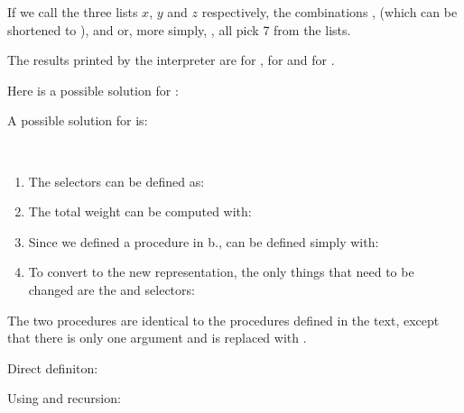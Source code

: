 \begin{exe}[2.25]
    If we call the three lists $x$, $y$ and $z$ respectively, the combinations 
    ,  (which can be 
    shortened to ), and\linebreak
    or, more simply,
    ,
    all pick 7 from the lists.
\end{exe}

\begin{exe}[2.26]
    The results printed by the interpreter are  for
    ,  for  and
     for .
\end{exe}

\begin{exe}[2.27]
    Here is a possible solution for :
\end{exe}

\begin{exe}[2.28]
    A possible solution for  is:
\end{exe}

\begin{exe}[2.29]
    \ \vspace{-20pt}
    \begin{enumerate}
        \item The selectors can be defined as:
        \item The total weight can be computed with:
        \item Since we defined a  procedure in b., 
             can be defined simply with:
        \item To convert to the new representation, the only things that need to 
            be changed are the  and  
            selectors:
    \end{enumerate}
\end{exe}

\begin{exe}[2.30]
    The two  procedures are identical to the  
    procedures defined in the text, except that there is only one argument and 
     is replaced with .

    Direct definiton:

    Using  and recursion:
\end{exe}

